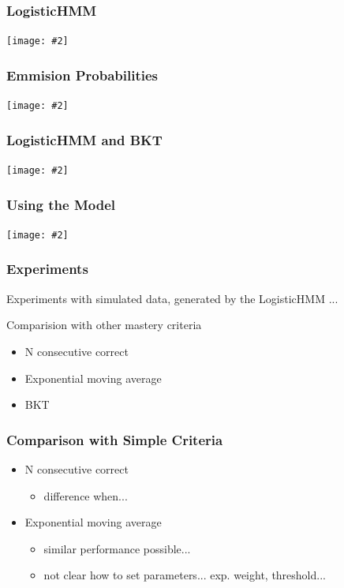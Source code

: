 \documentclass[bigger]{beamer}
\newcommand{\img}[2]{
  \begin{center}
    \texttt{[image: \#2]}
  \end{center}
}
\begin{document}
\begin{frame}
  \frametitle{LogisticHMM}

  \img{.8}{logistichmm-intuition}
\end{frame}

\begin{frame}
  \frametitle{Emmision Probabilities}

  \img{.7}{hmm-model-examples1}
\end{frame}

\begin{frame}
  \frametitle{LogisticHMM and BKT}

  \img{.7}{hmm-model-examples2}
\end{frame}

\begin{frame}
  \frametitle{Using the Model}

  \img{}{hmm-model-demo1}
\end{frame}

\begin{frame}
  \frametitle{Experiments}

  Experiments with simulated data, generated by the LogisticHMM ...

  Comparision with other mastery criteria

  \begin{itemize}
  \item N consecutive correct
  \item Exponential moving average
  \item BKT
  \end{itemize}
\end{frame}

\begin{frame}
  \frametitle{Comparison with Simple Criteria}

  \begin{itemize}
  \item N consecutive correct
    \begin{itemize}
    \item difference when...
    \end{itemize}
  \item Exponential moving average
    \begin{itemize}
    \item similar performance possible...
    \item not clear how to set parameters... exp. weight, threshold...
    \end{itemize}
  \end{itemize}
\end{frame}
\end{document}
